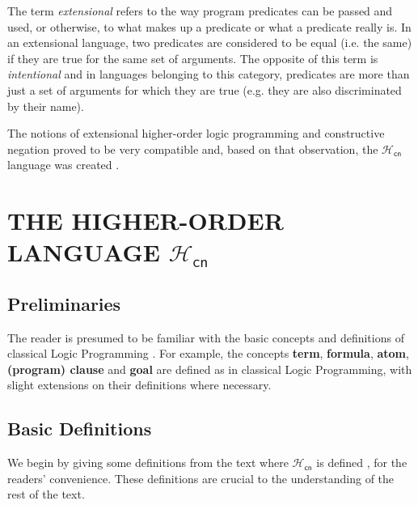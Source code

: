 \documentclass[inscr,ack,preface]{dithesis}
\theoremstyle{definition}
\newcommand{\hcn}{$\mathcal{H}_\mathsf{cn}$}
\begin{document}
The term \emph{extensional} refers to the way program predicates can be passed and used, or otherwise, to what makes up a predicate or what a predicate really is. In an extensional language, two predicates are considered to be equal (i.e. the same) if they are true for the same set of arguments. The opposite of this term is \emph{intentional} and in languages belonging to this category, predicates are more than just a set of arguments for which they are true (e.g. they are also discriminated by their name).

The notions of extensional higher-order logic programming and constructive negation proved to be very compatible and, based on that observation, the \hcn{} language was created \cite{DBLP:conf/kr/CharalambidisR14}.


\chapter{THE HIGHER-ORDER LANGUAGE \hcn}
\label{chap:hcn}

\section{Preliminaries}
The reader is presumed to be familiar with the basic concepts and definitions of classical Logic Programming \cite{Lloyd:1987:FLP:39279}. For example, the concepts \textbf{term}, \textbf{formula}, \textbf{atom}, \textbf{(program) clause} and \textbf{goal} are defined as in classical Logic Programming, with slight extensions on their definitions where necessary.

\section{Basic Definitions}
We begin by giving some definitions from the text where \hcn{} is defined \cite{DBLP:conf/kr/CharalambidisR14}, for the readers' convenience. These definitions are crucial to the understanding of the rest of the text.
\end{document}
